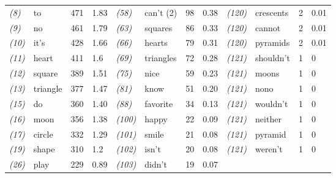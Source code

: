 \begin{screenonly}
\begin{table*}[h]
\begin{tabular*}{\hsize}{@{\extracolsep{\fill}}llllllllllll}
    \textsl{(8)} & to & 471 & 1.83 & \hspace*{2ex}\textsl{(58)} & can't (2) & 98 & 0.38 & \hspace*{2ex}\textsl{(120)} & crescents & 2 & 0.01\\
    \textsl{(9)} & no & 461 & 1.79 & \hspace*{2ex}\textsl{(63)} & squares & 86 & 0.33 & \hspace*{2ex}\textsl{(120)} & cannot & 2 & 0.01\\
    \textsl{(10)} & it's & 428 & 1.66 & \hspace*{2ex}\textsl{(66)} & hearts & 79 & 0.31 & \hspace*{2ex}\textsl{(120)} & pyramids & 2 & 0.01\\
    \textsl{(11)} & heart & 411 & 1.6 & \hspace*{2ex}\textsl{(69)} & triangles & 72 & 0.28 & \hspace*{2ex}\textsl{(121)} & shouldn't & 1 & 0\\
    \textsl{(12)} & square & 389 & 1.51 & \hspace*{2ex}\textsl{(75)} & nice & 59 & 0.23 & \hspace*{2ex}\textsl{(121)} & moons & 1 & 0\\
    \textsl{(13)} & triangle & 377 & 1.47 & \hspace*{2ex}\textsl{(81)} & know & 51 & 0.20 & \hspace*{2ex}\textsl{(121)} & nono & 1 & 0\\
    \textsl{(15)} & do & 360 & 1.40 & \hspace*{2ex}\textsl{(88)} & favorite & 34 & 0.13 & \hspace*{2ex}\textsl{(121)} & wouldn't & 1 & 0\\
    \textsl{(16)} & moon & 356 & 1.38 & \hspace*{2ex}\textsl{(100)} & happy & 22 & 0.09 & \hspace*{2ex}\textsl{(121)} & neither & 1 & 0\\
    \textsl{(17)} & circle & 332 & 1.29 & \hspace*{2ex}\textsl{(101)} & smile & 21 & 0.08 & \hspace*{2ex}\textsl{(121)} & pyramid & 1 & 0\\
    \textsl{(19)} & shape & 310 & 1.2 & \hspace*{2ex}\textsl{(102)} & isn't & 20 & 0.08 & \hspace*{2ex}\textsl{(121)} & weren't & 1 & 0\\
    \textsl{(26)} & play & 229 & 0.89 & \hspace*{2ex}\textsl{(103)} & didn't & 19 & 0.07 & & & & \\

\end{tabular*}
\end{table*}
\end{screenonly}
